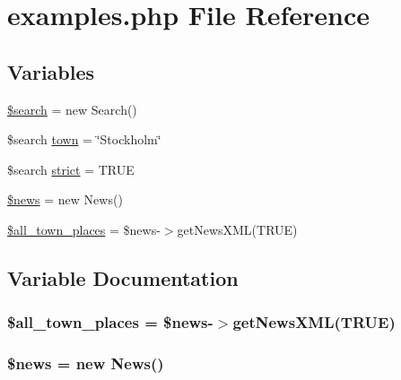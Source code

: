 \hypertarget{examples_8php}{}\section{examples.\+php File Reference}
\label{examples_8php}
\subsection*{Variables}
\begin{DoxyCompactItemize}
\item 
\hyperlink{examples_8php_ae549977dd05a017aa81372f6994bf955}{\$search} = new Search()
\item 
\$search \hyperlink{examples_8php_ae3c71a3989470842e166cd1dd69d3a9f}{town} = \char`\"{}Stockholm\char`\"{}
\item 
\$search \hyperlink{examples_8php_a31ee87c2ba3330fc9fb9eb9b0a07cbf5}{strict} = T\+R\+U\+E
\item 
\hyperlink{examples_8php_a5859ed8a4fb4033790869e605c6a8854}{\$news} = new News()
\item 
\hyperlink{examples_8php_a045f8f3362726d11fb335672794a812c}{\$all\+\_\+town\+\_\+places} = \$news-\/$>$get\+News\+X\+M\+L(T\+R\+U\+E)
\end{DoxyCompactItemize}


\subsection{Variable Documentation}
\hypertarget{examples_8php_a045f8f3362726d11fb335672794a812c}{}
\subsubsection[{\$all\+\_\+town\+\_\+places}]{\setlength{\rightskip}{0pt plus 5cm}\$all\+\_\+town\+\_\+places = \$news-\/$>$get\+News\+X\+M\+L(T\+R\+U\+E)}\label{examples_8php_a045f8f3362726d11fb335672794a812c}
\hypertarget{examples_8php_a5859ed8a4fb4033790869e605c6a8854}{}
\subsubsection[{\$news}]{\setlength{\rightskip}{0pt plus 5cm}\$news = new News()}\label{examples_8php_a5859ed8a4fb4033790869e605c6a8854}
\hypertarget{examples_8php_ae549977dd05a017aa81372f6994bf955}{}
